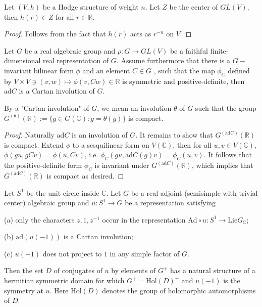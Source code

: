 \begin{lemma}
 \label{lemma-2}
 Let $(V,h)$ be a Hodge structure of weight $n$. Let $Z$ be the center of $GL(V)$, then $h(r) \in Z$ for all $r \in \mathbb R$.
\end{lemma} 

\begin{proof}
 Follows from the fact that $h(r)$ acts as $r^{-n}$ on $V$.
\end{proof}

\begin{lemma}
 \label{lemma-3}
 Let $G$ be a real algebraic group and $\rho:G \to GL(V)$ be a faithful finite-dimensional real representation of $G$. Assume furthermore that there is a $G-$ invariant bilinear form $\phi$ and an element $C\in G$ , such that the map $\phi_C$ defined by $V \times V \ni (v,w) \mapsto \phi(v,Cw) \in \mathbb R$ is symmetric and positive-definite, then $\text{ad} C$ is a Cartan involution of $G$. 
\end{lemma} 

\begin{remark}
 \label{remark-Cartan-involution}
 By a "Cartan involution" of $G$, we mean an involution $\theta$ of $G$ such that the group$G^{(\theta)}(\mathbb R):=\{g \in G(\mathbb C): g=\theta(\bar g)\}$ is compact. 
\end{remark}


\begin{proof}
Naturally $\text{ad} C$ is an involution of $G$. It remains to show that $ G^{(\text{ad}C)}(\mathbb R)$ is compact. Extend $\phi$ to a sesquilinear form on $V(\mathbb C)$, then for all $u,v \in V(\mathbb C)$, $\phi(gu,\bar gCv)=\phi(u,Cv)$, i.e. $\phi_C(gu,\text{ad}C(\bar g)v)=\phi_C(u,v)$. It follows that the positive-definite form $\phi_C$ is invariant under $G^{(\text{ad}C)}(\mathbb R)$, which implies that $G^{(\text{ad}C)}(\mathbb R)$ is compact as desired. 
\end{proof}

\begin{lemma}
 \label{lemma-4}
 Let $S^1$ be the unit circle inside $\mathbb C$. Let $G$ be a real adjoint (semisimple with trivial center) algebraic group and $u:S^1\to G$ be a representation satisfying

(a) only the characters $z,1,z^{-1}$ occur in the representation $\text{Ad} \circ u:S^1 \to \text{Lie}G_\mathbb C$;

(b) $\text{ad}(u(-1))$ is a Cartan involution;

(c) $u(-1)$ does not project to $1$ in any simple factor of $G$.

Then the set $D$ of conjugates of $u$ by elements of $G^+$ has a natural structure of a hermitian symmetric domain for which $G^+=\text{Hol}(D)^+$ and $u(-1)$ is the symmetry at $u$. Here $\text{Hol}(D)$ denotes the group of holomorphic automorphisms of $D$.

\end{lemma} 

